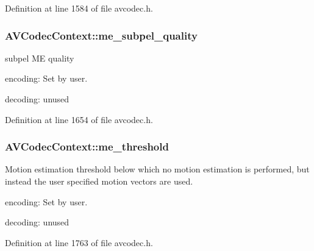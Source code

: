 Definition at line 1584 of file avcodec.\+h.

\subsubsection[{\texorpdfstring{me\+\_\+subpel\+\_\+quality}{me_subpel_quality}}]{ A\+V\+Codec\+Context\+::me\+\_\+subpel\+\_\+quality}\hypertarget{struct_a_v_codec_context_a3ad6d8644e00de2ecb636546d2e45121}{}\label{struct_a_v_codec_context_a3ad6d8644e00de2ecb636546d2e45121}
subpel ME quality
\begin{DoxyItemize}
\item encoding\+: Set by user.
\item decoding\+: unused 
\end{DoxyItemize}

Definition at line 1654 of file avcodec.\+h.

\subsubsection[{\texorpdfstring{me\+\_\+threshold}{me_threshold}}]{ A\+V\+Codec\+Context\+::me\+\_\+threshold}\hypertarget{struct_a_v_codec_context_aa7c2d0cc22f31003bef8a472aa70fd7f}{}\label{struct_a_v_codec_context_aa7c2d0cc22f31003bef8a472aa70fd7f}
Motion estimation threshold below which no motion estimation is performed, but instead the user specified motion vectors are used.


\begin{DoxyItemize}
\item encoding\+: Set by user.
\item decoding\+: unused 
\end{DoxyItemize}

Definition at line 1763 of file avcodec.\+h.

